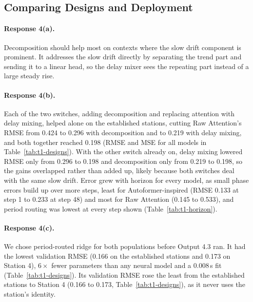 \documentclass{article}
\begin{document}
\subsection{Comparing Designs and Deployment}
\label{subsec:t1-deploy}

\paragraph{Response 4(a).}

Decomposition should help most on contexts where the slow drift component is prominent. It addresses the slow drift directly by separating the trend part and sending it to a linear head, so the delay mixer sees the repeating part instead of a large steady rise.

\paragraph{Response 4(b).}

Each of the two switches, adding decomposition and replacing attention with delay mixing, helped alone on the established stations, cutting Raw Attention's RMSE from 0.424 to 0.296 with decomposition and to 0.219 with delay mixing, and both together reached 0.198 (RMSE and MSE for all models in Table~\ref{tab:t1-designs}). With the other switch already on, delay mixing lowered RMSE only from 0.296 to 0.198 and decomposition only from 0.219 to 0.198, so the gains overlapped rather than added up, likely because both switches deal with the same slow drift. Error grew with horizon for every model, as small phase errors build up over more steps, least for Autoformer-inspired (RMSE 0.133 at step 1 to 0.233 at step 48) and most for Raw Attention (0.145 to 0.533), and period routing was lowest at every step shown (Table~\ref{tab:t1-horizon}).

\paragraph{Response 4(c).}

We chose period-routed ridge for both populations before Output 4.3 ran. It had the lowest validation RMSE (0.166 on the established stations and 0.173 on Station 4), $6\times$ fewer parameters than any neural model and a 0.008\,s fit (Table~\ref{tab:t1-designs}). Its validation RMSE rose the least from the established stations to Station 4 (0.166 to 0.173, Table~\ref{tab:t1-designs}), as it never uses the station's identity.
\end{document}
